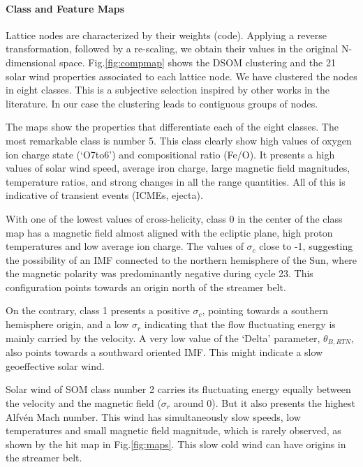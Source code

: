 \paragraph{Class and Feature Maps}

Lattice nodes are characterized by their weights (code). Applying a reverse transformation, followed by a re-scaling, we obtain their values in the original N-dimensional space. Fig.\ref{fig:compmap} shows the DSOM clustering and the 21 solar wind properties associated to each lattice node. We have clustered the nodes in eight classes. This is a subjective selection inspired by other works in the literature. In our case the clustering leads to contiguous groups of nodes.

The maps show the properties that differentiate each of the eight classes. The most remarkable class is number 5. This class clearly show high values of oxygen ion charge state (`O7to6') and compositional ratio (Fe/O). It presents a high values of solar wind speed, average iron charge, large magnetic field magnitudes, temperature ratios, and strong changes in all the range quantities.  All of this is indicative of transient events (ICMEs, ejecta).

With one of the lowest values of cross-helicity, class 0 in the center of the class map has a magnetic field almost aligned with the ecliptic plane, high proton temperatures and low average ion charge. The values of $\sigma_c$ close to -1, suggesting the possibility of an IMF connected to the northern hemisphere of the Sun, where the magnetic polarity was predominantly negative during cycle 23. This configuration points towards an origin north of the streamer belt.

On the contrary, class 1 presents a positive $\sigma_c$, pointing towards a southern hemisphere origin, and a low $\sigma_r$ indicating that the flow fluctuating energy is mainly carried by the velocity. A very low value of the `Delta' parameter, $\theta_{B,RTN}$, also points towards a southward oriented IMF. This might indicate a slow geoeffective solar wind.

Solar wind of SOM class number 2 carries its fluctuating energy equally between the velocity and the magnetic field ($\sigma_r$ around 0). But it also presents the highest Alfv\'en Mach number. This wind has simultaneously slow speeds, low temperatures and small magnetic field magnitude, which is rarely observed, as shown by the hit map in Fig.\ref{fig:maps}. This slow cold wind can have origins in the streamer belt.


